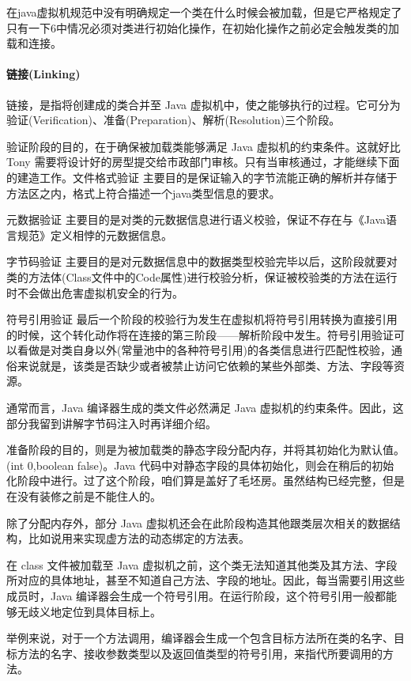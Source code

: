 \documentclass[../../../interview-questions.tex]{subfiles}
\begin{document}
在java虚拟机规范中没有明确规定一个类在什么时候会被加载，但是它严格规定了只有一下6中情况必须对类进行初始化操作，在初始化操作之前必定会触发类的加载和连接。

\paragraph{链接(Linking)}

链接，是指将创建成的类合并至 Java 虚拟机中，使之能够执行的过程。它可分为验证(Verification)、准备(Preparation)、解析(Resolution)三个阶段。

验证阶段的目的，在于确保被加载类能够满足 Java 虚拟机的约束条件。这就好比 Tony 需要将设计好的房型提交给市政部门审核。只有当审核通过，才能继续下面的建造工作。文件格式验证
主要目的是保证输入的字节流能正确的解析并存储于方法区之内，格式上符合描述一个java类型信息的要求。

元数据验证
主要目的是对类的元数据信息进行语义校验，保证不存在与《Java语言规范》定义相悖的元数据信息。

字节码验证
主要目的是对元数据信息中的数据类型校验完毕以后，这阶段就要对类的方法体(Class文件中的Code属性)进行校验分析，保证被校验类的方法在运行时不会做出危害虚拟机安全的行为。

符号引用验证
最后一个阶段的校验行为发生在虚拟机将符号引用转换为直接引用的时候，这个转化动作将在连接的第三阶段——解析阶段中发生。符号引用验证可以看做是对类自身以外(常量池中的各种符号引用)的各类信息进行匹配性校验，通俗来说就是，该类是否缺少或者被禁止访问它依赖的某些外部类、方法、字段等资源。

通常而言，Java 编译器生成的类文件必然满足 Java 虚拟机的约束条件。因此，这部分我留到讲解字节码注入时再详细介绍。

准备阶段的目的，则是为被加载类的静态字段分配内存，并将其初始化为默认值。(int 0,boolean false)。Java 代码中对静态字段的具体初始化，则会在稍后的初始化阶段中进行。过了这个阶段，咱们算是盖好了毛坯房。虽然结构已经完整，但是在没有装修之前是不能住人的。

除了分配内存外，部分 Java 虚拟机还会在此阶段构造其他跟类层次相关的数据结构，比如说用来实现虚方法的动态绑定的方法表。

在 class 文件被加载至 Java 虚拟机之前，这个类无法知道其他类及其方法、字段所对应的具体地址，甚至不知道自己方法、字段的地址。因此，每当需要引用这些成员时，Java 编译器会生成一个符号引用。在运行阶段，这个符号引用一般都能够无歧义地定位到具体目标上。

举例来说，对于一个方法调用，编译器会生成一个包含目标方法所在类的名字、目标方法的名字、接收参数类型以及返回值类型的符号引用，来指代所要调用的方法。
\end{document}
